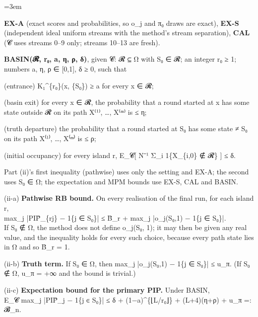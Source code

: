 \documentclass[11pt]{report}
\newenvironment{mdblock}{\begingroup\mdfont\raggedright\setlength{\parindent}{0pt}\setlength{\parskip}{0.55em}\emergencystretch=3em}{\par\endgroup}
\newcommand{\mdhead}[2]{\par\vspace{0.7em}\noindent{\bfseries\ifcase#1\or\large\or\normalsize\or\normalsize\or\small\or\small\or\small\fi #2}\par\nopagebreak\vspace{0.1em}}
\begin{document}
\begin{mdblock}
\mdhead{2}{2. Hypotheses}

\begin{mdbul}
\item \textbf{EX-A} (exact scores and probabilities, so o\_j and π₀ draws are exact), \textbf{EX-S} (independent ideal uniform streams with the method's stream separation), \textbf{CAL} (𝓒 uses streams 0–9 only; streams 10–13 are fresh).
\item \textbf{BASIN(𝓡, r₀, a, η, ρ, δ)}, given 𝓒: 𝓡 ⊆ Ω with S₀ ∈ 𝓡; an integer r₀ ≥ 1; numbers a, η, ρ ∈ [0,1], δ ≥ 0, such that

\begin{mdbul}
\item (entrance) K₁\textasciicircum{}\{r₀\}(x, \{S₀\}) ≥ a for every x ∈ 𝓡;
\item (basin exit) for every x ∈ 𝓡, the probability that a round started at x has some state outside 𝓡 on its path X⁽¹⁾, …, X⁽ᵐ⁾ is ≤ η;
\item (truth departure) the probability that a round started at S₀ has some state ≠ S₀ on its path X⁽¹⁾, …, X⁽ᵐ⁾ is ≤ ρ;
\item (initial occupancy) for every island r, E\_𝓒[ N⁻¹ Σ\_i 1\{X\_\{i,0\} ∉ 𝓡\} ] ≤ δ.
\end{mdbul}
\end{mdbul}

Part (ii)'s first inequality (pathwise) uses only the setting and EX-A; the second uses S₀ ∈ Ω; the expectation and MPM bounds use EX-S, CAL and BASIN.

\mdhead{2}{3. Conclusions}

(ii-a) \textbf{Pathwise RB bound.} On every realisation of the final run, for each island r,\\
\hspace*{1.5em}max\_j |PIP̂\_\{rj\} − 1\{j ∈ S₀\}| ≤ B̄\_r + max\_j |o\_j(S₀,1) − 1\{j ∈ S₀\}|.\\
\hspace*{1.5em}If S₀ ∉ Ω, the method does not define o\_j(S₀, 1); it may then be given any real value, and the inequality holds for every such choice, because every path state lies in Ω and so B̄\_r = 1.

(ii-b) \textbf{Truth term.} If S₀ ∈ Ω, then max\_j |o\_j(S₀,1) − 1\{j ∈ S₀\}| ≤ u\_π. (If S₀ ∉ Ω, u\_π = +∞ and the bound is trivial.)

(ii-c) \textbf{Expectation bound for the primary PIP.} Under BASIN,\\
\hspace*{1.5em}E\_𝓒 max\_j |PIP̂\_j − 1\{j ∈ S₀\}| ≤ δ + (1−a)\textasciicircum{}\{⌊L/r₀⌋\} + (L+4)(η+ρ) + u\_π =: 𝓑\_n.


\end{mdblock}
\end{document}

